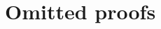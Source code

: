 \documentclass[sigplan,10pt,review,anonymous]{acmart}
\begin{document}
\maketitle







\appendix
\section{Omitted proofs}
\begingroup
{}

\lemsubstitution*
% 

\lemsubjectreductionredc*
% 

\thmsubjectreductionrede*
% 

\thmprogressrede*
% 

\endgroup
\end{document}
